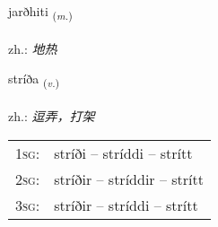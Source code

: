 \documentclass[frontgrid, backgrid]{flacards}\usepackage[]{graphicx}\usepackage[]{xcolor}
\begin{document}
\renewcommand{\flhead}{\vskip5pt \fboxsep=0pt {\small\bfseries\footnotesize Nafnorð | 名词}}
\renewcommand{\fcfoot}{\vskip5pt \fboxsep=0pt \hspace{2pt}{\small\bfseries\footnotesize 3K}}

\renewcommand{\blhead}{\vskip5pt {\small\bfseries\footnotesize Nafnorð | 名词 }}
\renewcommand{\bcfoot}{\vskip5pt \hspace{2pt}{\small\bfseries\footnotesize 3K}}


{jarðhiti \small{\textsubscript{(\textit{m.})}} \\[1ex] %
\textphonetic{[jarθhɪtɪ]} \\
zh.: \emph{地热} \\  [2ex]
\renewcommand*{\arraystretch}{0.8}
}

\renewcommand{\flhead}{\vskip5pt \fboxsep=0pt {\small\bfseries\footnotesize Sagnorð | 动词}}
\renewcommand{\fcfoot}{\vskip5pt \fboxsep=0pt \hspace{2pt}{\small\bfseries\footnotesize 3K}}

\renewcommand{\blhead}{\vskip5pt {\small\bfseries\footnotesize Sagnorð | 动词 }}
\renewcommand{\bcfoot}{\vskip5pt \hspace{2pt}{\small\bfseries\footnotesize 3K}}


{stríða \small{\textsubscript{(\textit{v.})}} \\[1ex] %
\textphonetic{[striːða]} \\
zh.: \emph{逗弄，打架} \\  [2ex]
\renewcommand*{\arraystretch}{0.8}
\begin{tabular}{p{1cm}l}
\textsc{1sg}: & stríði -- stríddi -- strítt \\ 
\textsc{2sg}: & stríðir -- stríddir -- strítt \\ 
\textsc{3sg}: & stríðir -- stríddi -- strítt \\ 
\end{tabular}
}
\end{document}
